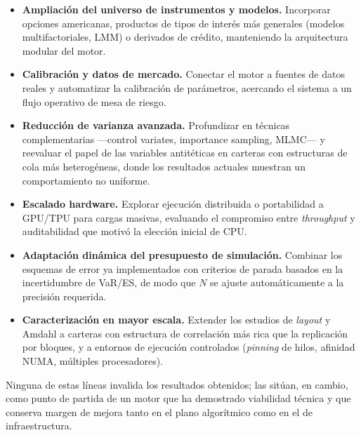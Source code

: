 \documentclass[11pt]{article}
\begin{document}
\begin{itemize}
    \item \textbf{Ampliación del universo de instrumentos y modelos.} Incorporar opciones americanas, productos de tipos de interés más generales (modelos multifactoriales, LMM) o derivados de crédito, manteniendo la arquitectura modular del motor.

    \item \textbf{Calibración y datos de mercado.} Conectar el motor a fuentes de datos reales y automatizar la calibración de parámetros, acercando el sistema a un flujo operativo de mesa de riesgo.

    \item \textbf{Reducción de varianza avanzada.} Profundizar en técnicas complementarias ---control variates, importance sampling, MLMC--- y reevaluar el papel de las variables antitéticas en carteras con estructuras de cola más heterogéneas, donde los resultados actuales muestran un comportamiento no uniforme.

    \item \textbf{Escalado hardware.} Explorar ejecución distribuida o portabilidad a GPU/TPU para cargas masivas, evaluando el compromiso entre \emph{throughput} y auditabilidad que motivó la elección inicial de CPU.

    \item \textbf{Adaptación dinámica del presupuesto de simulación.} Combinar los esquemas de error ya implementados con criterios de parada basados en la incertidumbre de VaR/ES, de modo que $N$ se ajuste automáticamente a la precisión requerida.

    \item \textbf{Caracterización en mayor escala.} Extender los estudios de \emph{layout} y Amdahl a carteras con estructura de correlación más rica que la replicación por bloques, y a entornos de ejecución controlados (\emph{pinning} de hilos, afinidad NUMA, múltiples procesadores).
\end{itemize}

Ninguna de estas líneas invalida los resultados obtenidos; las sitúan, en cambio, como punto de partida de un motor que ha demostrado viabilidad técnica y que conserva margen de mejora tanto en el plano algorítmico como en el de infraestructura.



\newpage

\printbibliography

\newpage
\end{document}

